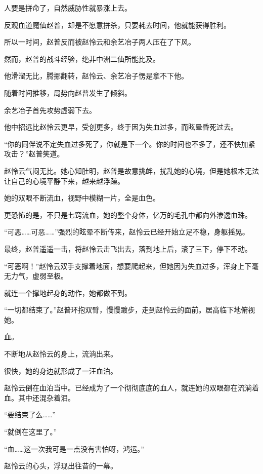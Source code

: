 
\begin{this_body}



人要是拼命了，自然威胁性就暴涨上去。

反观血道魔仙赵普，却是不愿意拼杀，只要耗去时间，他就能获得胜利。

所以一时间，赵普反而被赵怜云和余艺冶子两人压在了下风。

然而，赵普的战斗经验，绝非中洲二仙所能比及。

他滑溜无比，腾挪翻转，赵怜云、余艺冶子愣是拿不下他。

随着时间推移，局势向赵普发生了倾斜。

余艺冶子首先攻势虚弱下去。

他中招远比赵怜云更早，受创更多，终于因为失血过多，而眩晕昏死过去。

“你的同伴说不定失血过多死了，你就是下一个。你的时间也不多了，还不快加紧攻击？”赵普笑道。

赵怜云气闷无比。她心知肚明，赵普是故意挑衅，扰乱她的心境，但是她根本无法让自己的心境平静下来，越来越浮躁。

她的双眼不断流血，视野中模糊一片，全是血色。

更恐怖的是，不只是七窍流血，她的整个身体，亿万的毛孔中都向外渗透血珠。

“可恶……可恶……”强烈的眩晕不断传来，赵怜云已经开始立足不稳，身躯摇晃。

最终，赵普遥遥一击，将赵怜云击飞出去，落到地上后，滚了三下，停下不动。

“可恶啊！”赵怜云双手支撑着地面，想要爬起来，但她因为失血过多，浑身上下毫无力气，虚弱至极。

就连一个撑地起身的动作，她都做不到。

“一切都结束了。”赵普环抱双臂，慢慢踱步，走到赵怜云的面前。居高临下地俯视她。

血。

不断地从赵怜云的身上，流淌出来。

很快，她的身边就形成了一汪血泊。

赵怜云倒在血泊当中。已经成为了一个彻彻底底的血人，就连她的双眼都在流淌着血。其中还混杂着泪。

“要结束了么……”

“就倒在这里了。”

“血……这一次我可是一点没有害怕呀，鸿运。”

赵怜云的心头，浮现出往昔的一幕。


\end{this_body}
